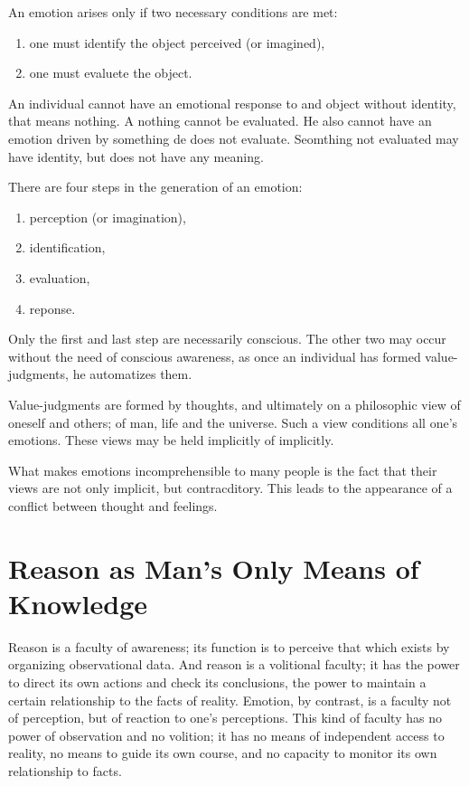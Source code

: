         An emotion arises only if two necessary conditions are met:

        \begin{enumerate}
            \item one must identify the object perceived (or imagined),
            \item one must evaluete the object.
        \end{enumerate}
    
        An individual cannot have an emotional response to and object without identity, that means nothing. A nothing cannot be evaluated. He also cannot have an emotion driven by something de does not evaluate. Seomthing not evaluated may have identity, but does not have any meaning.
    
        There are four steps in the generation of an emotion:

        \begin{enumerate}
            \item perception (or imagination),
            \item identification,
            \item evaluation,
            \item reponse.
        \end{enumerate}
    
        Only the first and last step are necessarily conscious. The other two may occur without the need of conscious awareness, as once an individual has formed value-judgments, he automatizes them.
        
        Value-judgments are formed by thoughts, and ultimately on a philosophic view of oneself and others; of man, life and the universe. Such a view conditions all one's emotions. These views may be held implicitly of implicitly.
        
        What makes emotions incomprehensible to many people is the fact that their views are not only implicit, but contracditory. This leads to the appearance of a conflict between thought and feelings.

    \section{Reason as Man's Only Means of Knowledge}
    
        Reason is a faculty of awareness; its function is to perceive that which exists by organizing observational data. And reason is a volitional faculty; it has the power to direct its own actions and check its conclusions, the power to maintain a certain relationship to the facts of reality. Emotion, by contrast, is a faculty not of perception, but of reaction to one's perceptions. This kind of faculty has no power of observation and no volition; it has no means of independent access to reality, no means to guide its own course, and no capacity to monitor its own relationship to facts.
        

